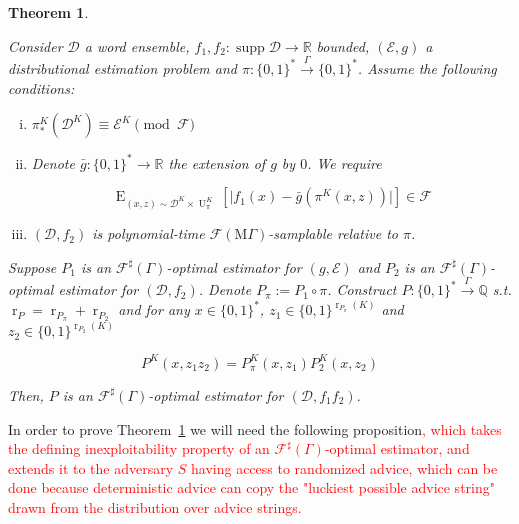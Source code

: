 \documentclass[11pt]{article}
\numberwithin{equation}{section}
\theoremstyle{definition}
\theoremstyle{plain}
\newtheorem{theorem}{Theorem}[section]
\newcommand{\Bool}{\{0,1\}}
\newcommand{\Words}{{\Bool^*}}
\newcommand{\WordsLen}[1]{{\Bool^{#1}}}
\DeclareMathOperator{\Supp}{supp}
\DeclareMathOperator{\E}{E}
\DeclareMathOperator{\R}{r}
\DeclareMathOperator{\Un}{U}
\newcommand{\Rats}{\mathbb{Q}}
\newcommand{\Reals}{\mathbb{R}}
\newcommand{\Abs}[1]{\lvert #1 \rvert}
\newcommand{\Dist}{\mathcal{D}}
\newcommand{\MGrow}{\mathrm{M}\Gamma}
\newcommand{\Fall}{\mathcal{F}}
\newcommand{\ESG}{\Fall^\sharp(\Gamma)}
\newcommand{\EMG}{\Fall(\MGrow)}
\newcommand{\Scheme}{\xrightarrow{\Gamma}}
\begin{document}
\begin{samepage}
\begin{theorem}
\label{thm:mult}

Consider $\Dist$ a word ensemble, $f_1, f_2: \Supp \Dist \rightarrow \Reals$ bounded, $(\mathcal{E},g)$ a distributional estimation problem and $\pi: \Words \Scheme \Words$. Assume the following conditions:

\begin{enumerate}[(i)]

\item\label{con:thm__mult__dist} $\pi_*^{K}(\Dist^{K}) \equiv \mathcal{E}^{K} \pmod \Fall$

\item\label{con:thm__mult__fun} Denote ${\bar{g}: \Words \rightarrow \Reals}$ the extension of $g$ by $0$.  We require

\[\E_{(x,z) \sim \Dist^{K} \times \Un_\pi^{K}}[\Abs{f_1(x)-\bar{g}(\pi^{K}(x,z))}] \in \Fall\]

\item\label{con:thm__mult__smp} $(\Dist, f_2)$ is polynomial-time $\EMG$-samplable relative to $\pi$.

\end{enumerate}

Suppose $P_1$ is an $\ESG$-optimal estimator for $(g,\mathcal{E})$ and $P_2$ is an $\ESG$-optimal estimator for $(\Dist,f_2)$. Denote $P_\pi := P_1 \circ \pi$. Construct ${P: \Words \Scheme \Rats}$ s.t. $\R_P=\R_{P_\pi}+\R_{P_2}$ and for any ${x \in \Words}$, ${z_1 \in \WordsLen{\R_{P_\pi}(K)}}$ and $z_2 \in \WordsLen{\R_{P_2}(K)}$

\begin{equation}
P^{K}(x,z_1 z_2)=P_\pi^{K}(x,z_1) P_2^{K}(x,z_2)
\end{equation}

Then, $P$ is an $\ESG$-optimal estimator for $(\Dist,f_1 f_2)$.

\end{theorem}
\end{samepage}

In order to prove Theorem~\ref{thm:mult} we will need the following proposition\textcolor{red}{, which takes the defining inexploitability property of an $\ESG$-optimal estimator, and extends it to the adversary $S$ having access to randomized advice, which can be done because deterministic advice can copy the "luckiest possible advice string" drawn from the distribution over advice strings.}
\end{document}
